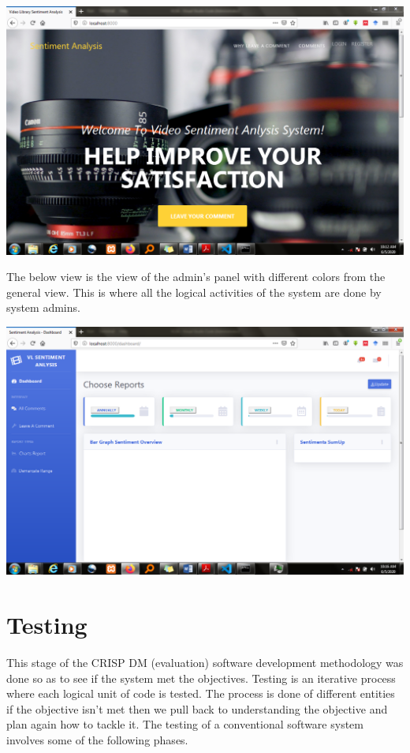 \documentclass[12pt]{report}
\begin{document}
	\includegraphics[scale=0.5]{home.PNG}
	
	The below view is the view of the admin’s panel with different colors from the general view. This is where all the logical activities of the system are done by system admins.
	
	\includegraphics[scale=0.5]{admin.PNG}
	
	
	\section{Testing}
	This stage of the CRISP DM (evaluation) software development methodology was done so as to see if the system met the objectives. Testing is an iterative process where each logical unit of code is tested. The process is done of different entities if the objective isn’t met then we pull back to understanding the objective and plan again how to tackle it. The testing of a conventional software system involves some of the following phases.\\
	
\end{document}
